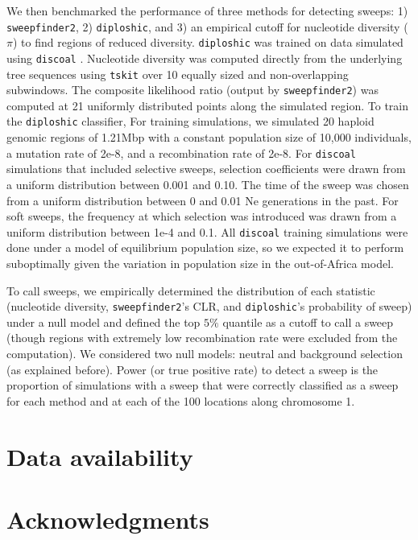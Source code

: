 \documentclass[hidelinks]{article}
\newcommand{\tskit}{\texttt{tskit}\xspace}
\newcommand{\sweepfinder}{\texttt{sweepfinder2}\xspace}
\newcommand{\diploshic}{\texttt{diploshic}\xspace}
\begin{document}
    We then benchmarked the performance of three methods for detecting sweeps: 1) \sweepfinder \citep{degiorgio2016sweepfinder2},
    2) \diploshic \citep{kern2018diplos}, and 3) an empirical cutoff for nucleotide diversity ($\pi$) to find regions of reduced diversity.
    \diploshic was trained on data simulated using \texttt{discoal} \citep{kern2016discoal}.
    Nucleotide diversity was computed directly from the underlying tree sequences using \tskit \citep{ralph2020efficiently} over 10 equally sized and non-overlapping subwindows.
    The composite likelihood ratio (output by \sweepfinder) was computed at 21 uniformly distributed points along the simulated region.
    To train the \diploshic classifier, 
    For training simulations, we simulated 20 haploid genomic regions of 1.21Mbp
    with a constant population size of 10,000 individuals, a mutation rate of 2e-8, and a recombination rate of 2e-8.
    For \texttt{discoal} simulations that included selective sweeps,
    selection coefficients were drawn from a uniform distribution between 0.001 and 0.10.
    The time of the sweep was chosen from a uniform distribution between 0 and 0.01 Ne generations in the past.
    For soft sweeps, the frequency at which selection was introduced was drawn from a uniform distribution between 1e-4 and 0.1.
    All \texttt{discoal} training simulations were done under a model of equilibrium population size, 
    so we expected it to perform suboptimally given the variation in population size in the out-of-Africa model.

    To call sweeps, we empirically determined the distribution of each statistic (nucleotide diversity, \sweepfinder's CLR, and \diploshic's probability of sweep) under a null model and defined the top $5\%$ quantile as a cutoff to call a sweep (though regions with extremely low recombination rate were excluded from the computation).
    We considered two null models: neutral and background selection (as explained before).
    Power (or true positive rate) to detect a sweep is the proportion of simulations with a sweep that were correctly classified as a sweep for each method and at each of the 100 locations along chromosome 1.

\section*{Data availability}\label{data_availability}


\section*{Acknowledgments}\label{acknowledgements}
\end{document}
